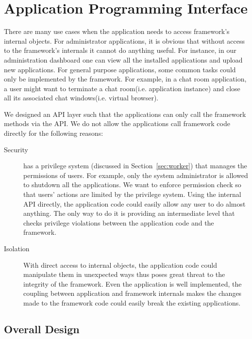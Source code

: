 \chapter{Application Programming Interface}
\label{ch:api}
There are many use cases when the application needs
to access framework's internal objects.
For administrator applications,
it is obvious that without access to the framework's internals
it cannot do anything useful.
For instance, in our administration dashboard one can
view all the installed applications and upload new applications.
For general purpose applications,
some common tasks could only be implemented by the framework.
For example,
in a chat room application,
a user might want to terminate a chat room(i.e. application instance)
and close all its associated chat windows(i.e. virtual browser).

We designed an API layer such that the applications can only call
the framework methods via the API.
We do not allow the applications call framework code directly for the
following reasons:

\begin{description}

\item[Security] \cb has a privilege system (discussed in
Section~\ref{sec:worker})  that manages the permissions of users. For example,
only the system administrator is allowed to shutdown all the  applications. We
want to enforce permission check so that users' actions  are limited by the
privilege system. Using the internal API directly, the application code could
easily allow any user to do almost anything. The only way to do it is
providing an intermediate level  that checks privilege violations between the
application code and the framework.

\item[Isolation] With direct access to internal objects, the application  code
could manipulate them in unexpected ways thus poses great threat to  the
integrity of the framework. Even the application is well implemented, the
coupling between application and framework internals makes the changes made to
the framework code could easily break the existing applications.

\end{description}


\section{Overall Design}

